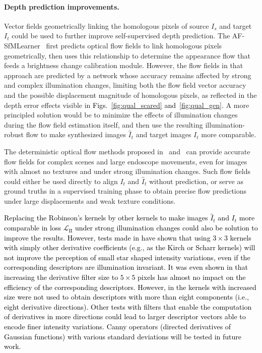 \documentclass[a4paper,fleqn]{cas-dc}
\begin{document}
\paragraph{Depth prediction improvements.}
Vector fields geometrically linking the homologous pixels of source $I_s$ and target $I_t$ could be used to further improve self-supervised depth prediction. The AF-SfMLearner~\citep{Shao_MIA_2022} first predicts optical flow fields to link homologous pixels geometrically, then uses this relationship to determine the appearance flow that feeds a brightness change calibration module. However, the flow fields in that approach are predicted by a network whose accuracy remains affected by strong and complex illumination changes, limiting both the flow field vector accuracy and the possible displacement magnitude of homologous pixels, as reflected in the depth error effects visible in \textcolor{black}{Figs.~\ref{fig:qual_scared} and~\ref{fig:qual_gen}.} A more principled solution would be to minimize the effects of illumination changes during the flow field estimation itself, and then use the resulting illumination-robust flow to make synthesized images $\hat{I}_t$ and target images $I_t$ more comparable. 
%

The deterministic optical flow methods proposed in~\citep{Trinh_CVIU_2019} and~\citep{Weibel_PR_2012} can provide accurate flow fields for complex scenes and large endoscope movements, even for images with almost no textures and under strong illumination changes. Such flow fields could either be used directly to align $I_t$ and $\hat{I}_t$ without prediction, or serve as ground truths in a supervised training phase to obtain precise flow predictions under large displacements and weak texture conditions.

\textcolor{black}{
Replacing the Robinson's kernels by other kernels to make images $\hat{I}_t$ and $I_t$ more comparable in loss $\mathcal{L}_{\textrm{II}}$ under strong illumination changes could also be solution to improve the results. However, tests made in \citep{Trinh_CVIU_2019} have shown that using $3\times 3$ kernels with simply other derivative coefficients (e.g., as the Kirch or Scharr kernels) will not improve the perception of small star shaped intensity variations, even if the corresponding descriptors are illumination invariant. It was even shown in \citep{Daul2026SPIE} that increasing the derivative filter size to $5\times 5$ pixels has almost no impact on the efficiency of the corresponding descriptors. However, in \citep{Daul2026SPIE} the kernels with increased size were not used to obtain descriptors with more than eight components (i.e., eight derivative directions). Other tests with filters that enable the computation of derivatives in more directions could lead to larger descriptor vectors able to encode finer intensity variations. Canny operators (directed derivatives of Gaussian functions) with various standard deviations will be tested in future work.}        
%
\end{document}
